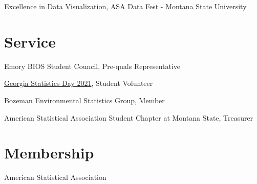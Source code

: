 \documentclass{wm_cv}
\begin{document}
Excellence in Data Visualization, ASA Data Fest - Montana State University \hfill  {}



\section{Service}

Emory BIOS Student Council, Pre-quals Representative \hfill  {}

\href{https://www.stat.uga.edu/events/content/2021/georgia-statistics-day-2021}{Georgia Statistics Day 2021}, Student Volunteer \hfill  {}

Bozeman Environmental Statistics Group, Member \hfill  {}

American Statistical Association Student Chapter at Montana State, Treasurer \hfill  {}

\section{Membership}

American Statistical Association \\
\end{document}
